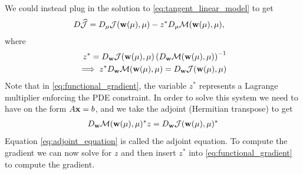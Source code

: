 We could instead plug in the solution to
\eqref{eq:tangent_linear_model} to get
\begin{align}
   D  \widehat{\mathcal{J}}
      &= D_{\mu}\mathcal{J}(\mathbf{w}(\mu), \mu) - z^* D_{\mu} \mathcal{M}(\mathbf{w}(\mu), \mu),
        \label{eq:functional_gradient}
\end{align}
where
\begin{align*}
  z^* = D_{\mathbf{w}}\mathcal{J}(\mathbf{w}(\mu), \mu) \left(  D_{\mathbf{w}} \mathcal{M}(\mathbf{w}(\mu), \mu) \right)^{-1} \\ 
  \implies z^* D_{\mathbf{w}} \mathcal{M}(\mathbf{w}(\mu), \mu) =  D_{\mathbf{w}}\mathcal{J}(\mathbf{w}(\mu), \mu)
  \label{eq:adjoint_equation}
\end{align*}
Note that in \eqref{eq:functional_gradient}, the variable $z^*$
represents a Lagrange multiplier enforcing the PDE constraint.  
In order to solve this system we need to have on the form $A\mathbf{x} =
b$, and we take the adjoint (Hermitian transpose) to get
\begin{align}
  D_{\mathbf{w}} \mathcal{M}(\mathbf{w}(\mu), \mu)^* z = D_{\mathbf{w}}\mathcal{J}(\mathbf{w}(\mu), \mu)^*
\end{align}
Equation \eqref{eq:adjoint_equation} is called the adjoint equation.
To compute the gradient we can now solve for $z$ and then insert $z^*$
into \eqref{eq:functional_gradient} to compute the gradient.




